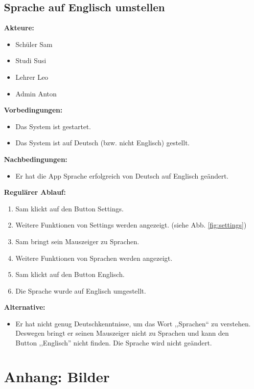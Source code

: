 \documentclass[fontsize=12pt,paper=a4,twoside]{scrartcl}
\begin{document}
\subsection{Sprache auf Englisch umstellen}
\textbf{Akteure:}
\begin{itemize}
	\item Schüler Sam
	\item Studi Susi
	\item Lehrer Leo
	\item Admin Anton
\end{itemize}
\textbf{Vorbedingungen:}
\begin{itemize}
	\item Das System ist gestartet.
	\item Das System ist auf Deutsch (bzw. nicht Englisch) gestellt.
\end{itemize}
\textbf{Nachbedingungen:}
\begin{itemize}
	\item Er hat die App Sprache erfolgreich von Deutsch auf Englisch geändert.
\end{itemize}
\textbf{Regulärer Ablauf:}
\begin{enumerate}
	\item Sam klickt auf den Button Settings.
	\item Weitere Funktionen von Settings werden angezeigt. (siehe Abb. \ref{fig:settings})
	\item Sam bringt sein Mauszeiger zu Sprachen.
	\item Weitere Funktionen von Sprachen werden angezeigt.
	\item Sam klickt auf den Button Englisch.
	\item Die Sprache wurde auf Englisch umgestellt.
\end{enumerate}
\textbf{Alternative:}
\begin{itemize}
	\item Er hat nicht genug Deutschkenntnisse, um das Wort ,,Sprachen`` zu verstehen. Deswegen bringt er seinen Mauszeiger nicht zu Sprachen und kann den Button ,,Englisch'' nicht finden. Die Sprache wird nicht geändert.
\end{itemize}


\clearpage
\section{Anhang: Bilder}
\end{document}
